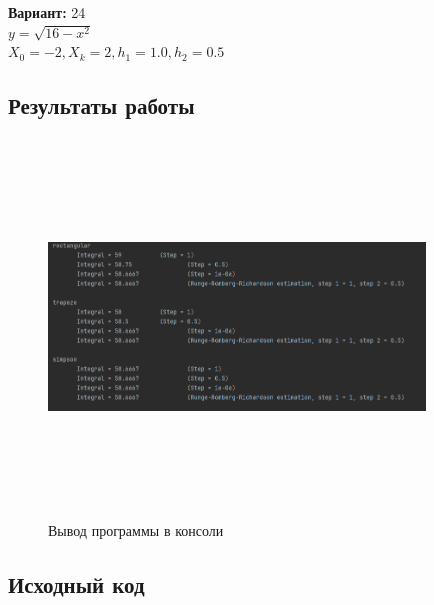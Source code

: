 {\bfseries Вариант:} 24\\
$y= \sqrt{16 - x^2}$\\
$X_0=-2, X_k=2, h_1=1.0, h_2=0.5$

\subsection{Результаты работы}
\begin{figure}[h!]
\centering
\includegraphics[width=10cm, height=10cm]{img/lab3_5_res.png}
\caption{Вывод программы в консоли}
\end{figure}
\pagebreak


\subsection{Исходный код}



